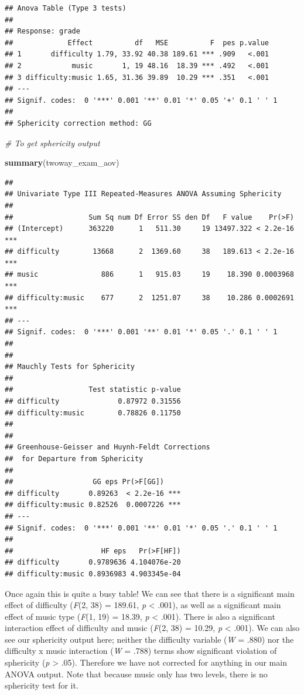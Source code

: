 \documentclass[
]{book}
\newenvironment{Shaded}{\begin{snugshade}}{\end{snugshade}}
\newcommand{\CommentTok}[1]{\textcolor[rgb]{0.56,0.35,0.01}{\textit{#1}}}
\newcommand{\FunctionTok}[1]{\textcolor[rgb]{0.13,0.29,0.53}{\textbf{#1}}}
\newcommand{\NormalTok}[1]{#1}
\begin{document}
\begin{verbatim}
## Anova Table (Type 3 tests)
## 
## Response: grade
##             Effect          df   MSE          F  pes p.value
## 1       difficulty 1.79, 33.92 40.38 189.61 *** .909   <.001
## 2            music       1, 19 48.16  18.39 *** .492   <.001
## 3 difficulty:music 1.65, 31.36 39.89  10.29 *** .351   <.001
## ---
## Signif. codes:  0 '***' 0.001 '**' 0.01 '*' 0.05 '+' 0.1 ' ' 1
## 
## Sphericity correction method: GG
\end{verbatim}

\begin{Shaded}
\begin{Highlighting}[]
\CommentTok{\# To get sphericity output}

\FunctionTok{summary}\NormalTok{(twoway\_exam\_aov)}
\end{Highlighting}
\end{Shaded}

\begin{verbatim}
## 
## Univariate Type III Repeated-Measures ANOVA Assuming Sphericity
## 
##                  Sum Sq num Df Error SS den Df   F value    Pr(>F)    
## (Intercept)      363220      1   511.30     19 13497.322 < 2.2e-16 ***
## difficulty        13668      2  1369.60     38   189.613 < 2.2e-16 ***
## music               886      1   915.03     19    18.390 0.0003968 ***
## difficulty:music    677      2  1251.07     38    10.286 0.0002691 ***
## ---
## Signif. codes:  0 '***' 0.001 '**' 0.01 '*' 0.05 '.' 0.1 ' ' 1
## 
## 
## Mauchly Tests for Sphericity
## 
##                  Test statistic p-value
## difficulty              0.87972 0.31556
## difficulty:music        0.78826 0.11750
## 
## 
## Greenhouse-Geisser and Huynh-Feldt Corrections
##  for Departure from Sphericity
## 
##                   GG eps Pr(>F[GG])    
## difficulty       0.89263  < 2.2e-16 ***
## difficulty:music 0.82526  0.0007226 ***
## ---
## Signif. codes:  0 '***' 0.001 '**' 0.01 '*' 0.05 '.' 0.1 ' ' 1
## 
##                     HF eps   Pr(>F[HF])
## difficulty       0.9789636 4.104076e-20
## difficulty:music 0.8936983 4.903345e-04
\end{verbatim}

Once again this is quite a busy table! We can see that there is a significant main effect of difficulty (\emph{F}(2, 38) = 189.61, \emph{p} \textless{} .001), as well as a significant main effect of music type (\emph{F}(1, 19) = 18.39, \emph{p} \textless{} .001). There is also a significant interaction effect of difficulty and music (\emph{F}(2, 38) = 10.29, \emph{p} \textless{} .001). We can also see our sphericity output here; neither the difficulty variable (\emph{W} = .880) nor the difficulty x music interaction (\emph{W} = .788) terms show significant violation of sphericity (\emph{p} \textgreater{} .05). Therefore we have not corrected for anything in our main ANOVA output. Note that because music only has two levels, there is no sphericity test for it.
\end{document}
